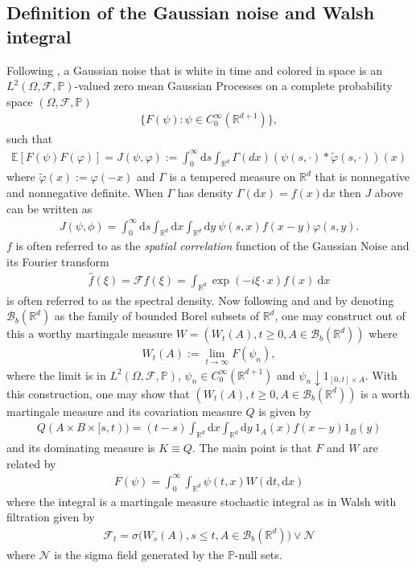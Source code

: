 \documentclass[a4paper,11pt]{article}%
\numberwithin{equation}{section}
\theoremstyle{plain}
\theoremstyle{definition}
\newcommand{\R}{\mathbb{R}}
\newcommand{\E}{\mathbb{E}}
\newcommand{\ud}{\ensuremath{ \mathrm{d} }}
\begin{document}
\subsection{Definition of the Gaussian noise and Walsh integral}

Following \cite{DalangEtc09Minicourse}, a Gaussian noise that is white in time and colored in space is an
$L^2(\Omega,\mathcal F,\mathbb P)$-valued zero mean Gaussian Processes on a complete probability space $(\Omega,\mathcal F,\mathbb P)$
\begin{align*}
	\{ F(\psi) : \psi \in C_0^\infty(\R^{d+1}) \} ,
\end{align*}
such that
\begin{align*}
	\E [ F(\psi)F(\varphi) ] = J(\psi,\varphi) := \int_0^\infty \ud s \int_{\R^d}
	\Gamma(dx)(\psi(s,\cdot)*\tilde{\varphi}(s,\cdot))(x)
\end{align*}
 where $\tilde{\varphi}(x):= \varphi(-x)$ and $\Gamma$ is a tempered measure on $\R^d$ that is nonnegative and nonnegative definite. When $\Gamma$ has density $\Gamma(\ud x) = f(x)\ud x$ then $J$ above can be written as
 \begin{align*}
	 J(\psi,\phi) = \int_0^\infty \ud s \int_{\R^d} \ud x \int_{\R^d} \ud y \: \psi(s,x)f(x-y)\varphi(s,y).
 \end{align*}
$f$ is often referred to as the \textit{spatial correlation} function of the Gaussian Noise and its Fourier transform
\begin{align*}
	\hat{f}(\xi)=\mathcal Ff(\xi) = \int_{\R^d}\exp(-i\xi\cdot x)f(x) \: \ud x
\end{align*}
is often referred to as the spectral density. Now following \cite{Walsh} and \cite{DalangEtc09Minicourse} and by
denoting $\mathscr B_b(\R^d)$ as the family of bounded Borel subsets of $\R^d$, one may construct out of this a worthy
martingale measure $W=(W_t(A),t\ge 0, A \in \mathscr B_b(\R^d))$ where
\begin{align*}
	W_t(A):= \lim \limits_{t\to \infty} F(\psi_n),
\end{align*}
where the limit is in $L^2(\Omega,\mathcal F,\mathbb P)$, $\psi_n \in C_0^\infty(\R^{d+1})$ and $\psi_n \downarrow
1_{[0,t]\times A}. $ With this construction, one may show that $(W_t(A),t\ge 0, A \in \mathscr B_b(\R^d))$ is a worth
martingale measure and its covariation measure $Q$ is given by
\begin{align*}
	Q(A \times B \times [s,t)) = (t-s)\int_{\R^d} \ud x \int_{\R^d} \ud y \: 1_A(x)f(x-y)1_B(y)
\end{align*}
and its dominating measure is $K \equiv Q$. The main point is that $F$ and $W$ are related by
\begin{align*}
	F(\psi) = \int_0^\infty \int_{\R^d} \psi (t,x) W(\ud t, \ud x)
\end{align*}
where the integral is a martingale measure stochastic integral as in Walsh with filtration given by
\begin{align*}
	\mathcal F_t = \sigma \big(W_s(A), s \le t, A \in \mathscr B_b(\R^d) \big) \vee \mathscr N
\end{align*}
where $\mathscr N$ is the sigma field generated by the $\mathbb P$-null sets.
\end{document}
